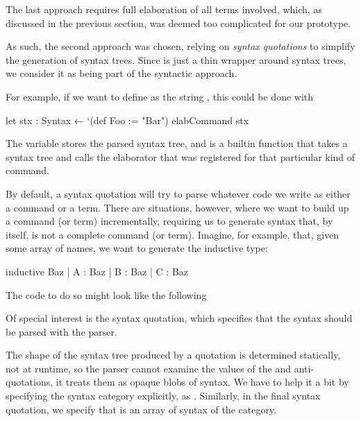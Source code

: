 The last approach requires full elaboration of all terms involved, which, as discussed in the previous section, was deemed too complicated for our prototype.

As such, the second approach was chosen, relying on \emph{syntax quotations} to simplify the generation of syntax trees.
Since  is just a thin wrapper around syntax trees, we consider it as being part of the syntactic approach.

For example, if we want to define  as the string , this could be done with
\begin{leancode}
    let stx : Syntax ← `(def Foo := "Bar")
    elabCommand stx
\end{leancode}
The variable  stores the parsed syntax tree, and  is a builtin function  that takes a  syntax tree and calls the elaborator that was registered for that particular kind of command.

By default, a syntax quotation will try to parse whatever code we write as either a command or a term. There are situations, however, where we want to build up a command (or term) incrementally, requiring us to generate syntax that, by itself, is not a complete command (or term). Imagine, for example, that, given some array \lean{[`A, `B, `C]} of names, we want to generate the inductive type:
\begin{leancode}
    inductive Baz
      | A : Baz
      | B : Baz
      | C : Baz
\end{leancode}
The code to do so might look like the following
Of special interest is the  syntax quotation, which specifies that the syntax should be parsed with the  parser. 

The shape of the syntax tree produced by a quotation is determined statically, not at runtime, so the parser cannot examine the values of the  and  anti-quotations, it treats them as opaque blobs of syntax. We have to help it a bit by specifying the syntax category explicitly, as .
Similarly, in the final \inductive{} syntax quotation, we specify that  is an array of syntax of the  category.

